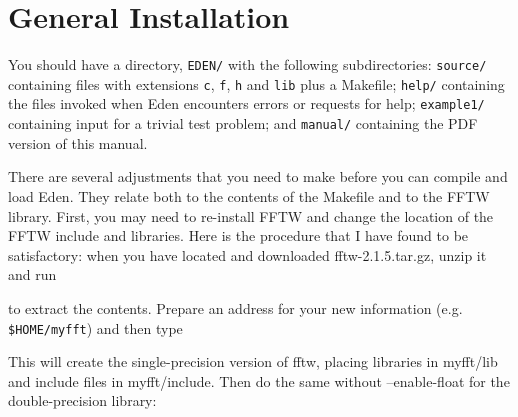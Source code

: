 \documentclass{report}
\begin{document}
{\appendix
\chapter {General Installation}
\label{app-installation}

You should have a directory, {\tt EDEN/} with the following subdirectories:
{\tt source/} containing files with extensions {\tt c},
{\tt f}, {\tt h} and {\tt lib} plus a Makefile;
{\tt help/} containing the files invoked when Eden encounters errors or
requests for help;
{\tt example1/} containing input for a trivial test problem;
and {\tt manual/} containing the PDF version of this manual.

\vspace {0.1in}

There are several adjustments that you need to make before you can compile 
and load Eden.  They relate both to the contents of the Makefile and to 
the FFTW library.  First, you may need to re-install FFTW and change the 
location of the FFTW include and libraries.  Here is the procedure that 
I have found to be satisfactory: when you have located
and downloaded fftw-2.1.5.tar.gz, unzip it and run

\vspace {0.1in}


\vspace {0.1in}

to extract the contents. 
Prepare an address for your new information (e.g. {\tt \$HOME/myfft})
and then type

\vspace{0.1in}




\vspace{0.1in}

This will create the single-precision version of fftw, 
placing libraries in myfft/lib and include files in myfft/include.  
Then do the same without --enable-float for the double-precision library:

 \vspace{0.1in}



}
\end{document}
